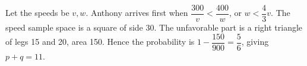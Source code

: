 Let the speeds be $v,w$. Anthony arrives first when $\dfrac{300}{v}<\dfrac{400}{w}$, or $w<\dfrac{4}{3}v$. The speed sample space is a square of side 30. The unfavorable part is a right triangle of legs 15 and 20, area 150. Hence the probability is $1-\dfrac{150}{900}=\dfrac{5}{6}$, giving $\boxed{p+q=11}$.
